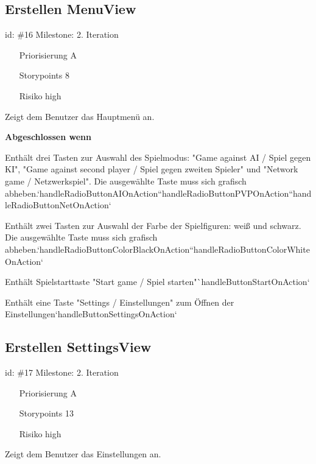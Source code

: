 \subsection*{Erstellen MenuView}
id: \#16 Milestone: 2. Iteration\\

\begin{itemize}
\item[Priorisierung] A
\item[Storypoints] 8
\item[Risiko] high
\end{itemize}

Zeigt dem Benutzer das Hauptmenü an.

\textbf{Abgeschlossen wenn}
\begin{todolist}
    \item[\done]  Enthält drei Tasten zur Auswahl des Spielmodus: "Game against AI / Spiel gegen KI", "Game against second player / Spiel gegen zweiten Spieler" und "Network game / Netzwerkspiel". Die ausgewählte Taste muss sich grafisch abheben.`handleRadioButtonAIOnAction``handleRadioButtonPVPOnAction``handleRadioButtonNetOnAction`
  \item[\done]  Enthält zwei Tasten zur Auswahl der Farbe der Spielfiguren: weiß und schwarz. Die ausgewählte Taste muss sich grafisch abheben.`handleRadioButtonColorBlackOnAction``handleRadioButtonColorWhiteOnAction`
  \item[\done]  Enthält Spielstarttaste "Start game / Spiel starten"`handleButtonStartOnAction`
  \item[\done]  Enthält eine Taste "Settings / Einstellungen" zum Öffnen der Einstellungen`handleButtonSettingsOnAction`

\end{todolist}


\subsection*{Erstellen SettingsView}
id: \#17 Milestone: 2. Iteration\\

\begin{itemize}
\item[Priorisierung] A
\item[Storypoints] 13
\item[Risiko] high
\end{itemize}

Zeigt dem Benutzer das Einstellungen an.

